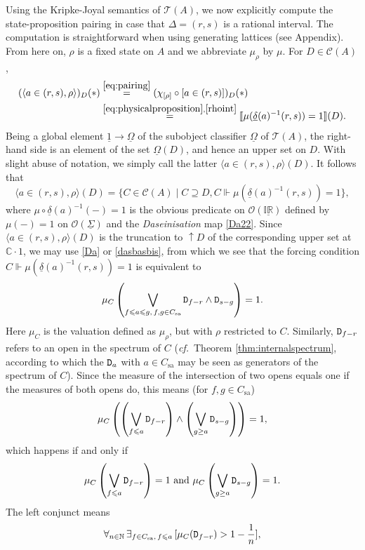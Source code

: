 \documentclass[11pt]{article}
\newcommand{\IR}{\mathbb{IR}}
\newcommand{\beq}{\begin{equation}}
\newcommand{\eeq}{\end{equation}}
\newcommand{\er}{\eqref}
\newcommand{\dl}{\delta} \newcommand{\Dl}{\Delta}
\newcommand{\rh}{\rho} \newcommand{\sg}{\sigma}
\newcommand{\ch}{\chi} \newcommand{\ps}{\psi} \newcommand{\Ps}{\Psi}
\newcommand{\CA}{{\mathcal A}} \newcommand{\CB}{{\mathcal B}}
\newcommand{\CO}{{\mathcal O}} \newcommand{\CP}{{\mathcal P}}
\newcommand{\C}{{\mathbb C}} \newcommand{\D}{{\mathbb D}}
\newcommand{\alg}[1]{\ensuremath{#1}}
\newcommand{\functor}[1]{\ensuremath{\underline{#1}}}
\newcommand{\after}{\circ}
\newcommand{\context}{\ensuremath{\mathcal{C}}}
\newcommand{\asstopos}{\ensuremath{\mathcal{T}}}
\newcommand{\interpretation}[1]{\ensuremath{\llbracket{#1}\rrbracket}}
\newcommand{\sa}{\ensuremath{_{\mathrm{sa}}}}
\newcommand{\prop}[1]{\ensuremath{\mbox{\texttt{#1}}}}
\newcommand{\field}[1]{\ensuremath{\mathbb{#1}}}
\renewcommand{\CA}{\mathcal{C}(A)}
\newcommand{\TA}{\mathcal{T}(A)}
\newcommand{\ulS}{\functor{\Sigma}}
\renewcommand{\TA}{\asstopos(\alg{A})}
\renewcommand{\CA}{\context(\alg{A})}
\begin{document}
Using the Kripke-Joyal semantics of $\TA$, we now explicitly
compute the state-proposition pairing in case that $\Dl=(r,s)$ is a rational interval.
 The computation is straightforward
when using generating lattices (see Appendix). From here on, $\rh$ is a fixed state on $A$ and we abbreviate
$\mu_{\rho}$ by $\mu$. For $D \in \CA$,
\begin{align*}
  (\langle a \in (r,s), \rho \rangle)_D(*)
  & \stackrel{\eqref{eq:pairing}}{=}
    (\ch_{[\rh]} \after [a \in (r,s)])_D(*) \\
  & \stackrel{\eqref{eq:physicalproposition},\eqref{rhoint}}{=}
    \interpretation{\mu(\underline{\dl}(a)^{-1}(r,s))=1}(D).
\end{align*}
Being a global element $\underline{1} \to \underline{\Omega}$ of
the subobject classifier $\functor{\Omega}$ of $\TA$, the right-hand side
is an element of  the set $\functor{\Omega}(D)$, and hence an upper set on $D$.
With slight abuse of notation, we simply call the latter
$\langle a \in (r,s), \rho \rangle(D)$.
It follows that
\beq  \langle a \in (r,s), \rho \rangle(D)=
 \{ C\in \CA \mid C\supseteq D,  C \Vdash \mu(\underline{\dl}(a)^{-1}(r,s))=1 \},\label{truth}
\eeq
where $\mu\circ\underline{\dl}(a)^{-1}(-)=1$ is the obvious predicate on $\CO(\underline{\IR})$
defined by $\mu(-)=1$ on $\CO(\ulS)$ and the {\it Daseinisation} map \er{Da22}.
Since $\langle a \in (r,s), \rho \rangle(D)$ is the truncation to $\uparrow\! D$ of the corresponding
upper set at $\C\cdot 1$, we may use  \er{Da} or \er{dasbasbis}, from which  we see that the forcing condition \hbox{$C \Vdash
\mu(\underline{\dl}(a)^{-1}(r,s))=1$} is equivalent to
\[
 \mu_C\left( \bigvee_{f \leqslant a \leqslant g,\, f,g\in C\sa} \prop{D}_{f-r} \wedge
  \prop{D}_{s-g} \right) = 1.
\]
Here $\mu_C$ is the valuation defined as $\mu_{\rh}$, but with $\rho$
restricted to $C$. Similarly, $\prop{D}_{f-r}$ refers to an open in
the spectrum of $C$ ({\it cf.}\ Theorem \ref{thm:internalspectrum},
according to which the $\prop{D}_a$ with $a\in C\sa$ may be seen as
generators of the spectrum of $C$). Since the measure of the
intersection of two opens equals one if the measures of both opens do,
this means (for $f,g\in C\sa$)
\[
 \mu_C\left(\left( \bigvee_{f \leqslant a} \prop{D}_{f-r} \right) \wedge
            \left( \bigvee_{g \geq a} \prop{D}_{s-g} \right)\right) = 1,
\]
which happens if and only if
\[
 \mu_C\left( \bigvee_{f \leqslant a} \prop{D}_{f-r} \right) = 1
  \mbox{  and  }
 \mu_C\left( \bigvee_{g \geq a} \prop{D}_{s-g} \right) = 1.
\]
The left conjunct means
\begin{equation}
 \forall_{n \in \field{N}}\, \exists_{f\in C\sa,\,  f \leqslant
  a}\, [ \mu_C(\prop{D}_{f-r}) > 1-\frac{1}{n}]\label{equals-one},
\end{equation}
\end{document}
